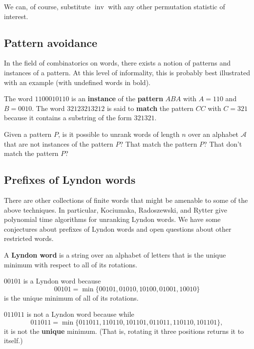We can, of course, substitute $\operatorname{inv}$ with any other permutation
statistic of interest.

\subsection{Pattern avoidance}
In the field of combinatorics on words, there exists a notion of patterns and
instances of a pattern. At this level of informality, this is probably best
illustrated with an example (with undefined words in bold).

\begin{example}
  The word $1100010110$ is an \textbf{instance} of the \textbf{pattern} $ABA$ with $A = 110$ and
  $B = 0010$.
  The word $32123213212$ is said to \textbf{match} the pattern $CC$ with $C = 321$ because
  it contains a substring of the form $321321$.
\end{example}

\begin{openquestion}
  Given a pattern $P$, is it possible to unrank words of length $n$ over an
  alphabet $\mathcal A$ that are not instances of the pattern $P$?
  That match the pattern $P$? That don't match the pattern $P$?
\end{openquestion}

\subsection{Prefixes of Lyndon words}
There are other collections of finite words that might be amenable to some of
the above techniques. In particular, Kociumaka, Radoszewski, and Rytter
\cite{Kociumaka2014} give polynomial time algorithms for unranking Lyndon
words. We have some conjectures about prefixes of Lyndon words and open
questions about other restricted words.
\begin{definition}
  A \textbf{Lyndon word} is a string over an alphabet of letters
  that is the unique minimum with respect to all of its rotations.
\end{definition}
\begin{example}
  $00101$ is a Lyndon word because \begin{equation}
    00101 = \min\{00101, 01010, 10100, 01001, 10010\}
  \end{equation} is the unique minimum of all of its rotations.

  $011011$ is not a Lyndon word because while \begin{equation}
    011011 = \min\{011011, 110110, 101101, 011011, 110110, 101101\},
  \end{equation}
  it is not the \textbf{unique} minimum.
  (That is, rotating it three positions returns it to itself.)
\end{example}

